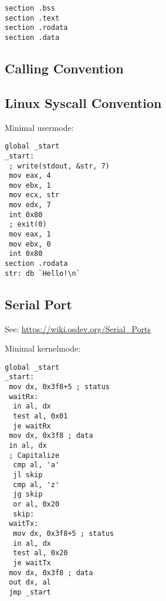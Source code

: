 \documentclass[8pt]{article}
\begin{document}
\begin{multicols}{5}
\begin{lstlisting}
section .bss
section .text
section .rodata
section .data
\end{lstlisting}

\subsection*{Calling Convention}

\subsection*{Linux Syscall Convention}


Minimal usermode:

\begin{lstlisting}
global _start
_start:
 ; write(stdout, &str, 7)
 mov eax, 4
 mov ebx, 1
 mov ecx, str
 mov edx, 7
 int 0x80
 ; exit(0)
 mov eax, 1
 mov ebx, 0
 int 0x80
section .rodata
str: db `Hello!\n`
\end{lstlisting}

\subsection*{Serial Port}

See: \url{https://wiki.osdev.org/Serial_Ports}

Minimal kernelmode:

\begin{lstlisting}
global _start
_start:
 mov dx, 0x3f8+5 ; status
 waitRx:
  in al, dx
  test al, 0x01
  je waitRx
 mov dx, 0x3f8 ; data
 in al, dx
 ; Capitalize
  cmp al, 'a'
  jl skip
  cmp al, 'z'
  jg skip
  or al, 0x20
  skip:
 waitTx:
  mov dx, 0x3f8+5 ; status
  in al, dx
  test al, 0x20
  je waitTx
 mov dx, 0x3f8 ; data
 out dx, al
 jmp _start
\end{lstlisting}

\end{multicols}
\end{document}
